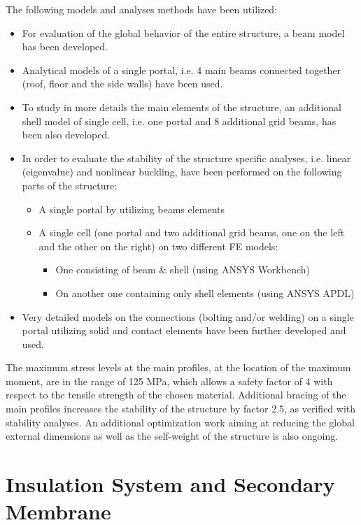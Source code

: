 The following models and analyses methods have been utilized:
\begin{itemize}
 \item{For evaluation of the global behavior of the entire structure,
       a beam model has been developed.}
 \item{Analytical models of a single portal, i.e. 4 main beams 
       connected together (roof, floor and the side walls) 
       have been used.}
 \item{To study in more details the main elements of the structure, 
       an additional shell model of single cell, i.e. one portal 
       and 8 additional grid beams, has been also developed.}
 \item{In order to evaluate the stability of the structure specific 
       analyses, i.e. linear (eigenvalue) and nonlinear buckling, 
       have been performed on the following parts of the structure:}
 \begin{itemize}
  \item{A single portal by utilizing beams elements}
  \item{A single cell (one portal and two additional grid beams, one 
        on the left and the other on the right) on two different FE models:}
  \begin{itemize}
   \item{One consisting of beam \& shell (using ANSYS Workbench)}
   \item{On another one containing only shell elements (using ANSYS APDL)} 
  \end{itemize}
 \end{itemize}
 \item{Very detailed models on the connections (bolting and/or welding) 
       on a single portal utilizing solid and contact elements have 
       been further developed and used.}
\end{itemize}

The maximum stress levels at the main profiles, at the location of 
the maximum moment, are in the range of 125 MPa, which allows a 
safety factor of 4 with respect to the tensile strength of the 
chosen material. Additional bracing of the main profiles increases 
the stability of the structure by factor 2.5, as verified with 
stability analyses.  An additional optimization work aiming at 
reducing the global external dimensions as well as the self-weight 
of the structure is also ongoing. 

\section{Insulation System and Secondary Membrane}
\label{subsec:insul-2nd-mem}

